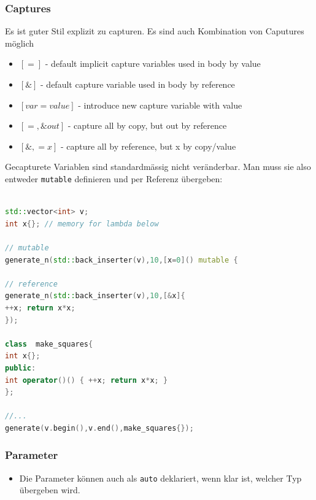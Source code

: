 \subsubsection{Captures}
Es ist guter Stil explizit zu capturen. Es sind auch Kombination von Caputures möglich
\begin{itemize}
	\item $[=]$ - default implicit capture variables used in body by value  
	\item $[\&]$ - default capture variable used in body by reference 
	\item $[var=value]$ - introduce new capture variable with value 
	\item $[=,\&out]$ - capture all by copy, but out by reference 
	\item $[\&,=x]$ - capture all by reference, but x by copy/value 
\end{itemize}
Gecapturete Variablen sind standardmässig nicht veränderbar. Man muss sie also entweder \lstinline|mutable| definieren und per Referenz übergeben:
\begin{lstlisting}[language=C++]

std::vector<int> v;
int x{}; // memory for lambda below

// mutable
generate_n(std::back_inserter(v),10,[x=0]() mutable { 

// reference
generate_n(std::back_inserter(v),10,[&x]{
++x; return x*x;
});

class  make_squares{
int x{};
public:
int operator()() { ++x; return x*x; }
};

//...
generate(v.begin(),v.end(),make_squares{});
\end{lstlisting}


\subsubsection{Parameter}
\begin{itemize}
	\item Die Parameter können auch als \lstinline|auto| deklariert, wenn klar ist, welcher Typ übergeben wird.
\end{itemize}

\clearpage

